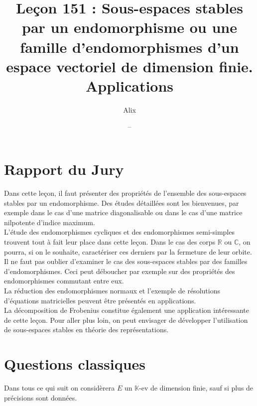 \documentclass[answers,11pt]{exam}
\title{Leçon 151 : Sous-espaces stables par un endomorphisme ou une famille d'endomorphismes d'un espace vectoriel de dimension finie. Applications}
\author{\sc{Mathieu} Alix}
\date{--}
\newcommand{\KK}{\mathbb{K}}
\newcommand{\RR}{\mathbb{R}}
\newcommand{\CC}{\mathbb{C}}
\begin{document}
\maketitle

\section{Rapport du Jury}

\og Dans cette leçon, il faut présenter des propriétés de l'ensemble des sous-espaces stables par un endomorphisme. Des études détaillées sont les bienvenues, par exemple dans le cas d'une matrice diagonalisable ou dans le cas d'une matrice nilpotente d'indice maximum.\\

L'étude des endomorphismes cycliques et des endomorphismes semi-simples trouvent tout à fait leur place dans cette leçon. Dans le cas des corps $\RR$ ou $\CC$, on pourra, si on le souhaite, caractériser ces derniers par la fermeture de leur orbite. \\

Il ne faut pas oublier d'examiner le cas des sous-espaces stables par des familles d'endomorphismes. Ceci peut déboucher par exemple sur des propriétés des endomorphismes commutant entre eux.\\

La réduction des endomorphismes normaux et l'exemple de résolutions d'équations matricielles peuvent être présentés en applications.\\

La décomposition de Frobenius constitue également une application intéressante de cette leçon. Pour aller plus loin, on peut envisager de développer l'utilisation de sous-espaces stables en théorie des représentations.
\fg

\section{Questions classiques}

Dans tous ce qui suit on considèrera $E$ un $\KK$-ev de dimension finie, sauf si plus de précisions sont données.
\end{document}
